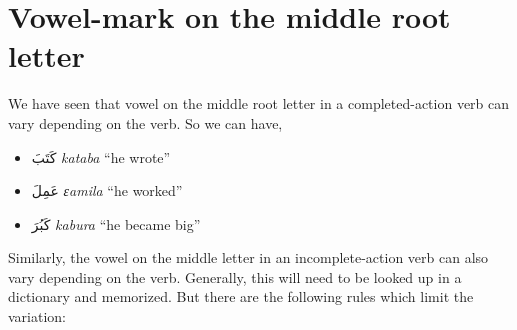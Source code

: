\documentclass[
  10pt,
]{book}
\providecommand{\tightlist}{%
  \setlength{\itemsep}{0pt}\setlength{\parskip}{0pt}}
\begin{document}
\section{Vowel-mark on the middle root letter}\label{vowel-mark-on-the-middle-root-letter}

We have seen that vowel on the middle root letter in a completed-action verb can vary depending on the verb. So we can have,

\begin{itemize}
\tightlist
\item
  \foreignlanguage{arabic}{کَتَبَ} \emph{kataba} \enquote{he wrote}
\item
  \foreignlanguage{arabic}{عَمِلَ} \emph{ɛamila} \enquote{he worked}
\item
  \foreignlanguage{arabic}{کَبُرَ} \emph{kabura} \enquote{he became big}
\end{itemize}

Similarly, the vowel on the middle letter in an incomplete-action verb can also vary depending on the verb. Generally, this will need to be looked up in a dictionary and memorized. But there are the following rules which limit the variation:
\end{document}
